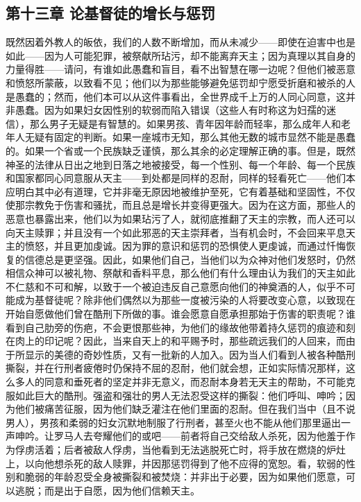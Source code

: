 
\subsection{第十三章 论基督徒的增长与惩罚}

既然因着外教人的皈依，我们的人数不断增加，而从未减少——即使在迫害中也是如此——因为人可能犯罪，被祭献所玷污，却不能离弃天主；因为真理以其自身的力量得胜——请问，有谁如此愚蠢和盲目，看不出智慧在哪一边呢？但他们被恶意和愤怒所蒙蔽，以致看不见；他们以为那些能够避免惩罚却宁愿受折磨和被杀的人是愚蠢的；然而，他们本可以从这件事看出，全世界成千上万的人同心同意，这并非愚蠢。因为如果妇女因性别的软弱而陷入错误（这些人有时称这为妇孺的迷信），那么男子无疑是有智慧的。如果男孩、青年因年龄而轻率，那么成年人和老年人无疑有固定的判断。如果一座城市无知，那么其他无数的城市显然不能是愚蠢的。如果一个省或一个民族缺乏谨慎，那么其余的必定理解正确的事。但是，既然神圣的法律从日出之地到日落之地被接受，每一个性别、每一个年龄、每一个民族和国家都同心同意服从天主——到处都是同样的忍耐，同样的轻看死亡——他们本应明白其中必有道理，它并非毫无原因地被维护至死，它有着基础和坚固性，不仅使那宗教免于伤害和骚扰，而且总是增长并变得更强大。因为在这方面，那些人的恶意也暴露出来，他们以为如果玷污了人，就彻底推翻了天主的宗教，而人还可以向天主赎罪；并且没有一个如此邪恶的天主崇拜者，当有机会时，不会回来平息天主的愤怒，并且更加虔诚。因为罪的意识和惩罚的恐惧使人更虔诚，而通过忏悔恢复的信德总是更坚强。因此，如果他们自己，当他们以为众神对他们发怒时，仍然相信众神可以被礼物、祭献和香料平息，那么他们有什么理由认为我们的天主如此不仁慈和不可和解，以致于一个被迫违反自己意愿向他们的神奠酒的人，似乎不可能成为基督徒呢？除非他们偶然以为那些一度被污染的人将要改变心意，以致现在开始自愿做他们曾在酷刑下所做的事。谁会愿意自愿承担那始于伤害的职责呢？谁看到自己肋旁的伤疤，不会更恨那些神，为他们的缘故他带着持久惩罚的痕迹和刻在肉上的印记呢？因此，当来自天上的和平赐予时，那些疏远我们的人回来，而由于所显示的美德的奇妙性质，又有一批新的人加入。因为当人们看到人被各种酷刑撕裂，并在行刑者疲倦时仍保持不屈的忍耐，他们就会想，正如实际情况那样，这么多人的同意和垂死者的坚定并非无意义，而忍耐本身若无天主的帮助，不可能克服如此巨大的酷刑。强盗和强壮的男人无法忍受这样的撕裂：他们呼叫、呻吟；因为他们被痛苦征服，因为他们缺乏灌注在他们里面的忍耐。但在我们当中（且不说男人），男孩和柔弱的妇女沉默地制服了行刑者，甚至火也不能从他们那里逼出一声呻吟。让罗马人去夸耀他们的或吧——前者将自己交给敌人杀死，因为他羞于作为俘虏活着；后者被敌人俘虏，当他看到无法逃脱死亡时，将手放在燃烧的炉灶上，以向他想杀死的敌人赎罪，并因那惩罚得到了他不应得的宽恕。看，软弱的性别和脆弱的年龄忍受全身被撕裂和被焚烧：并非出于必要，因为如果他们愿意，可以逃脱；而是出于自愿，因为他们信赖天主。\par

